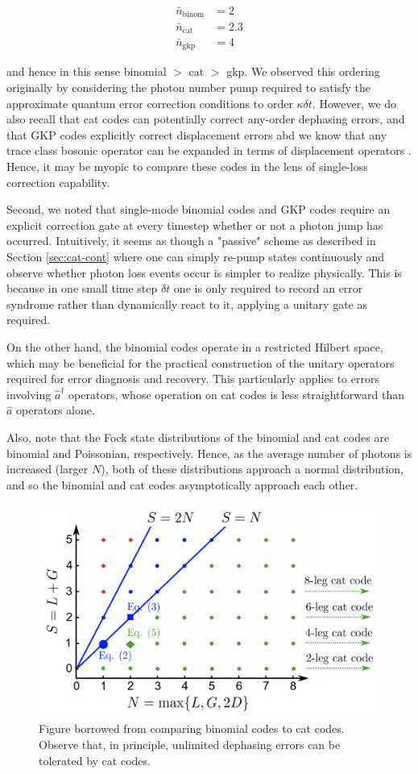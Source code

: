 \documentclass[12]{amsart}
\newcommand\0{\mathbf{0}}
\newcommand\<{\langle}
\renewcommand\>{\rangle}
\begin{document}
\begin{align*}
	\bar{n}_{\text{binom}} &= 2\\
	\bar{n}_{\text{cat}} &= 2.3\\
	\bar{n}_{\text{gkp}} &= 4
\end{align*}

and hence in this sense binomial $>$ cat $>$ gkp. We observed this ordering originally by considering the photon number pump required to satisfy the approximate quantum error correction conditions to order $\kappa \delta t$. However, we do also recall that cat codes can potentially correct any-order dephasing errors, and that GKP codes explicitly correct displacement errors abd we know that any trace class bosonic operator can be expanded in terms of displacement operators \cite{albert2017performance}. Hence, it may be myopic to compare these codes in the lens of single-loss correction capability.

Second, we noted that single-mode binomial codes and GKP codes require an explicit correction gate at every timestep whether or not a photon jump has occurred. Intuitively, it seems as though a "passive" scheme as described in Section \ref{sec:cat-cont} where one can simply re-pump states continuously and observe whether photon loss events occur is simpler to realize physically. This is because in one small time step $\delta t$ one is only required to record an error syndrome rather than dynamically react to it, applying a unitary gate as required.

On the other hand, the binomial codes operate in a restricted Hilbert space, which may be beneficial for the practical construction of the unitary operators required for error diagnosis and recovery. This particularly applies to errors involving $\hat{a}^\dag$ operators, whose operation on cat codes is less straightforward than $\hat{a}$ operators alone.

Also, note that the Fock state distributions of the binomial and cat codes are binomial and Poissonian, respectively. Hence, as the average number of photons is increased (larger $N$), both of these distributions approach a normal distribution, and so the binomial and cat codes asymptotically approach each other. 

\begin{figure}
\centering
\includegraphics[width=0.5\linewidth,keepaspectratio]{binom_cat.png}	
\caption{Figure borrowed from \cite{michael2016new} comparing binomial codes to cat codes. Observe that, in principle, unlimited dephasing errors can be tolerated by cat codes.}
\end{figure}
\end{document}
